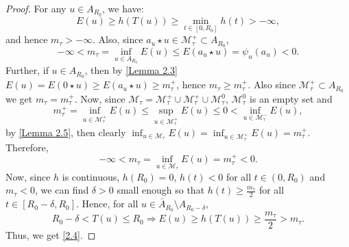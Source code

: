 \documentclass[11pt]{article}
\numberwithin{equation}{section}
\numberwithin{mytheorem}{section}
\begin{document}
		\begin{proof}
			For any $u\in A_{R_0}$, we have:
			$$E(u)\geq h(T(u))\geq \min_{t\in [0,R_0]}h(t)>-\infty,$$
			and hence $m_{\tau}>-\infty$. Also, since $a_u\star u \in \mathcal{M}_{\tau}^+\subset A_{R_0}$, $$-\infty< m_{\tau}=\displaystyle \inf_{u\in A_{R_0}}E(u)\leq E(a_u\star u)=\psi_u(a_u)<0.$$ 
			Further, if $u\in A_{R_0}$, then by \autoref{Lemma 2.3} $E(u)=E(0\star u)\geq E(a_u\star u)\geq m_{\tau}^+$, hence $m_{\tau}\geq m_{\tau}^+$. Also since $\mathcal{M}_{\tau}^+\subset A_{R_0}$ we get $m_{\tau}=m_{\tau}^+$. Now, since $\mathcal{M}_{\tau}=\mathcal{M}_{\tau}^+\cup \mathcal{M}_{\tau}^+\cup\mathcal{M}_{\tau}^0$, $\mathcal{M}_{\tau}^0$ is an empty set and 
			$$m_{\tau}^+=\inf_{u\in \mathcal{M}_{\tau}^+}E(u)\leq \sup_{u\in \mathcal{M}_{\tau}^+}E(u)\leq 0<\inf_{u\in \mathcal{M}_{\tau}^-}E(u),$$
			by \autoref{Lemma 2.5}, then clearly $\displaystyle \inf_{u\in \mathcal{M}_{\tau}}E(u)=\inf_{u\in \mathcal{M}_{\tau}^+}E(u)=m_{\tau}^+$. Therefore,
			$$-\infty<m_{\tau}=\inf_{u\in \mathcal{M}_{\tau}}E(u)=m_{\tau}^+<0.$$
			Now, since $h$ is continuous, $h(R_{0})=0$, $h(t)<0$ for all $t\in (0,R_0)$ and $m_{\tau}<0$, we can find $\delta>0$ small enough so that $h(t)\geq \frac{m_{\tau}}{2}$ for all $t\in [R_0-\delta,R_0]$. Hence, for all $u\in \bar{A}_{R_0}\setminus A_{R_0-\delta}$,
			$$R_0-\delta<T(u)\leq R_0 \Rightarrow E(u)\geq h(T(u))\geq \frac{m_{\tau}}{2}>m_{\tau}.$$
			Thus, we get \eqref{2.4}.
		\end{proof}
\end{document}
